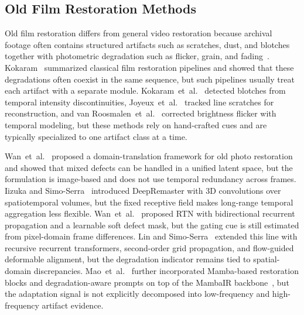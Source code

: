{\subsection{Old Film Restoration Methods}

Old film restoration differs from general video restoration because archival footage often contains structured artifacts such as scratches, dust, and blotches together with photometric degradation such as flicker, grain, and fading~\cite{kokaram1998motion}. Kokaram~\cite{kokaram1998motion} summarized classical film restoration pipelines and showed that these degradations often coexist in the same sequence, but such pipelines usually treat each artifact with a separate module. Kokaram~et~al.~\cite{kokaram1995blotch} detected blotches from temporal intensity discontinuities, Joyeux~et~al.~\cite{joyeux2001scratch} tracked line scratches for reconstruction, and van Roosmalen~et~al.~\cite{vanroosmalen1999flicker} corrected brightness flicker with temporal modeling, but these methods rely on hand-crafted cues and are typically specialized to one artifact class at a time.

Wan~et~al.~\cite{wan2020bringing} proposed a domain-translation framework for old photo restoration and showed that mixed defects can be handled in a unified latent space, but the formulation is image-based and does not use temporal redundancy across frames. Iizuka and Simo-Serra~\cite{iizuka2019deepremaster} introduced DeepRemaster with 3D convolutions over spatiotemporal volumes, but the fixed receptive field makes long-range temporal aggregation less flexible. Wan~et~al.~\cite{rtn2022} proposed RTN with bidirectional recurrent propagation and a learnable soft defect mask, but the gating cue is still estimated from pixel-domain frame differences. Lin and Simo-Serra~\cite{rrtn2024} extended this line with recursive recurrent transformers, second-order grid propagation, and flow-guided deformable alignment, but the degradation indicator remains tied to spatial-domain discrepancies. Mao~et~al.~\cite{mao2025mambaofr} further incorporated Mamba-based restoration blocks and degradation-aware prompts on top of the MambaIR backbone~\cite{guo2024mambair}, but the adaptation signal is not explicitly decomposed into low-frequency and high-frequency artifact evidence.

}
